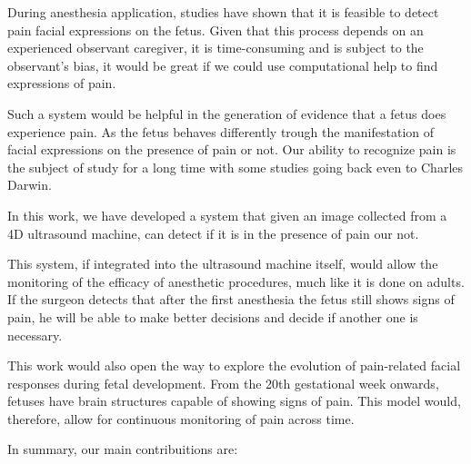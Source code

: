 \documentclass[msc]{ppgccufmg}
\begin{document}
During anesthesia application, studies have shown that it is feasible to detect pain facial expressions on the fetus. Given that this process depends on an experienced observant caregiver, it is time-consuming and is subject to the observant's bias, it would be great if we could use computational help to find expressions of pain. 

Such a system would be helpful in the generation of evidence that a fetus does experience pain. As the fetus behaves differently trough the manifestation of facial expressions on the presence of pain or not. Our ability to recognize pain is the subject of study for a long time with some studies going back even to Charles Darwin.

In this work, we have developed a system that given an image collected from a 4D ultrasound machine, can detect if it is in the presence of pain our not. 

This system, if integrated into the ultrasound machine itself, would allow the monitoring of the efficacy of anesthetic procedures, much like it is done on adults. If the surgeon detects that after the first anesthesia the fetus still shows signs of pain, he will be able to make better decisions and decide if another one is necessary.

This work would also open the way to explore the evolution of pain-related facial responses during fetal development. From the 20th gestational week onwards, fetuses have brain structures capable of showing signs of pain. This model would, therefore, allow for continuous monitoring of pain across time.

In summary, our main contribuitions are:

\end{document}
